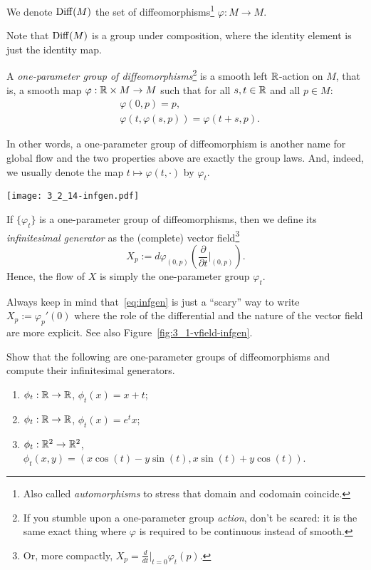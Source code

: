 \begin{definition}
  We denote $\operatorname{Diff}(M)$ the set of diffeomorphisms\footnote{Also called \emph{automorphisms} to stress that domain and codomain coincide.} $\varphi: M \to M$.

  Note that $\operatorname{Diff}(M)$ is a group under composition, where the identity element is just the identity map.
\end{definition}

\begin{definition}
  A \emph{one-parameter group of diffeomorphisms}\footnote{If you stumble upon a one-parameter group \emph{action}, don't be scared: it is the same exact thing where $\varphi$ is required to be continuous instead of smooth.} is a smooth left $\mathbb{R}$-action on $M$, that is, a smooth map $\varphi:\mathbb{R}\times M \to M$ such that for all $s,t\in\mathbb{R}$ and all $p\in M$:
  \begin{align}
     & \varphi(0,p) = p,                            \\
     & \varphi(t, \varphi(s, p)) = \varphi(t+s, p).
  \end{align}

  In other words, a one-parameter group of diffeomorphism is another name for global flow and the two properties above are exactly the group laws.
  And, indeed, we usually denote the map $t\mapsto\varphi(t,\cdot)$ by $\varphi_t$.


  \begin{marginfigure}
    \texttt{[image: 3\_2\_14-infgen.pdf]}
  \end{marginfigure}
  If $\{\varphi_t\}$ is a one-parameter group of diffeomorphisms, then we define its \emph{infinitesimal generator} as the (complete) vector field\footnote{Or, more compactly, ${X_p = \frac{d}{dt}\big|_{t=0}\varphi_t(p)}$.}
  \begin{equation}\label{eq:infgen}
    X_p := d\varphi_{(0,p)}\left(\frac{\partial}{\partial t}\Big|_{(0,p)}\right).
  \end{equation}
  Hence, the flow of $X$ is simply the one-parameter group $\varphi_t$.

  Always keep in mind that~\eqref{eq:infgen} is just a ``scary'' way to write $X_p := \varphi_p'(0)$ where the role of the differential and the nature of the vector field are more explicit. See also Figure~\ref{fig:3_1-vfield-infgen}.
\end{definition}

\begin{exercise}
  Show that the following are one-parameter groups of diffeomorphisms and compute their infinitesimal generators.
  \begin{enumerate}
    \item $\phi_t:\mathbb{R}\to\mathbb{R}$, $\phi_t(x) = x + t$;
    \item $\phi_t:\mathbb{R}\to\mathbb{R}$, $\phi_t(x) = e^t x$;
    \item $\phi_t:\mathbb{R}^2\to\mathbb{R}^2$, $\phi_t(x,y) = (x\cos(t) - y\sin(t), x\sin(t)+y\cos(t))$.
  \end{enumerate}
\end{exercise}

